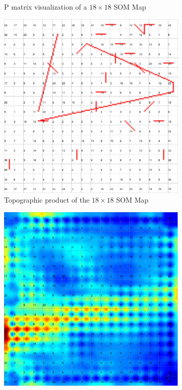 \documentclass{acm_proc_article-sp}
\begin{document}
\begin{figure}
\begin{subfigure}[b]{0.45\linewidth}
    \caption{P matrix visualization of a $18\times18$ SOM Map}
    \label{fig:wine-mid-p-matrix}
\end{subfigure}
\begin{subfigure}[b]{0.45\linewidth}
    \includegraphics[width=\linewidth]{img/wine-mid-radius-neighbourhood-graph}
    \caption{Topographic product of the $18\times18$ SOM Map}
    \label{fig:wine-mid-radius-neighbourhood-graph}
\end{subfigure}
\begin{subfigure}[b]{0.45\linewidth}
    \includegraphics[width=\linewidth]{img/wine-mid-u-matrix}

\end{subfigure}
\end{figure}
\end{document}
